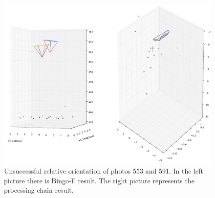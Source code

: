 \documentclass[a4paper,12pt]{article}
\begin{document}
\begin{center}
 \begin{figure}[!h]
    \includegraphics[scale=0.4]{figures/rel_or_553_591.png}
    \caption{Unsuccessful relative orientation of photos 553 and 591. 
    In the left picture there 
    is Bingo-F result. The right picture represents the processing chain result.}
    \label{fig:rel_or_ok}
\end{figure}
\end{center}
\end{document}
